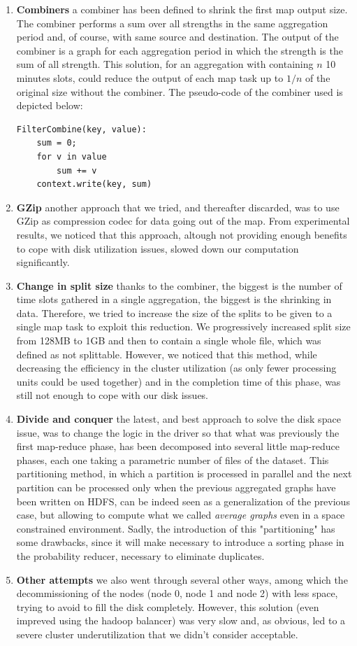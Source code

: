 \begin{enumerate}
\item \textbf{Combiners} a combiner has been defined to shrink the first map output size. The combiner performs a sum over all strengths in the same aggregation period and, of course, with same source and destination. 
The output of the combiner is a graph for each aggregation period in which the strength is the sum of all strength.
This solution, for an aggregation with containing $n$ 10 minutes slots, could reduce the output of each map task up to $1/n$ of the original size without the combiner. 
The pseudo-code of the combiner used is depicted below:
\begin{verbatim}
FilterCombine(key, value):
	sum = 0;
	for v in value
		sum += v
	context.write(key, sum)
\end{verbatim}
\item \textbf{GZip} another approach that we tried, and thereafter discarded, was to use GZip as compression codec for data going out of the map. From experimental results, we noticed that this approach, altough not providing enough benefits
to cope with disk utilization issues, slowed down our computation significantly.
\item \textbf{Change in split size} thanks to the combiner, the biggest is the number of time slots gathered in a single aggregation, the biggest is the shrinking in data. 
Therefore, we tried to increase the size of the splits to be given to a single map task to exploit this reduction. We progressively increased split size from 128MB to 1GB and then to contain a single whole file, which was defined as not splittable.
However, we noticed that this method, while decreasing the efficiency in the cluster utilization (as only fewer processing units could be used together) and in the completion time of this phase, was still not enough to cope with our disk issues.
\item \textbf{Divide and conquer} the latest, and best approach to solve the disk space issue, was to change the logic in the driver so that what was previously the first map-reduce phase, has been decomposed into several little map-reduce phases, each one taking a parametric number of files of the dataset.
This partitioning method, in which a partition is processed in parallel and the next partition can be processed only when the previous aggregated graphs have been written on HDFS, can be indeed seen as a generalization of the previous case, but allowing to compute what we called \emph{average graphs} even in a space constrained environment. 
Sadly, the introduction of this "partitioning" has some drawbacks, since it will make necessary to introduce a sorting phase in the probability reducer, necessary to eliminate duplicates.
\item \textbf{Other attempts} we also went through several other ways, among which the decommissioning of the nodes (node 0, node 1 and node 2) with less space, trying to avoid to fill the disk completely.
However, this solution (even impreved using the hadoop balancer) was very slow and, as obvious, led to a severe cluster underutilization that we didn't consider acceptable.
\end{enumerate}
